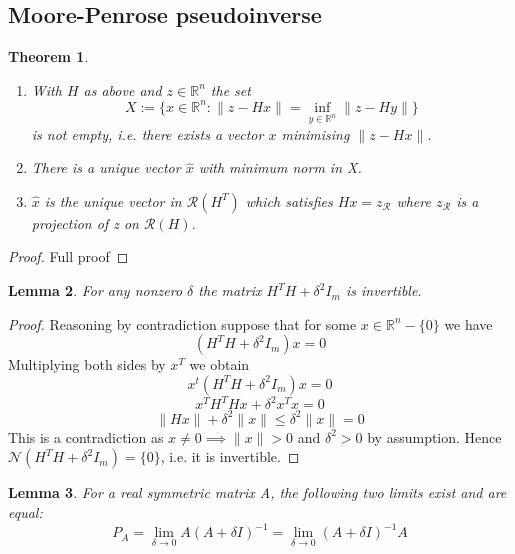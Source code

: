 \documentclass[a4paper]{article}
\theoremstyle{break}
\newtheorem{theorem}{Theorem}[section]
\newtheorem{lemma}[theorem]{Lemma}
\newcommand{\R}{\mathbb{R}}
\newcommand{\Nu}{\mathcal{N}}
\newcommand{\Ra}{\mathcal{R}}
\begin{document}
\subsection{Moore-Penrose pseudoinverse}

\begin{theorem}
\begin{enumerate}
    \item With $H$ as above and $z \in \R^n$ the set
        \begin{equation*}
        X := \{ x \in \R^n : \| z - H x \| = \inf\limits_{y \in \R^n} \| z - H y \| \}
        \end{equation*}
        is not empty, i.e. there exists a vector $x$ minimising $\| z - H x \|$.
    \item There is a unique vector $\hat{x}$ with minimum norm in X.
    \item $\hat{x}$ is the unique vector in $\Ra(H^T)$ which satisfies $Hx = z_\Ra$ where $z_\Ra$ is a projection of z on $\Ra(H)$.
\end{enumerate}
\end{theorem}
\begin{proof}
    Full proof
\end{proof}

\begin{lemma}
    For any nonzero $\delta$ the matrix $H^T H + \delta^2  I_m$ is invertible.
    \label{thm:invertible}
\end{lemma}
\begin{proof}
    Reasoning by contradiction suppose that for some $x \in \R^n - \{0\}$ we have
    $$ (H^T H + \delta^2  I_m) x = 0 $$ %
Multiplying both sides by $x^T$ we obtain
    $$ x^t (H^T H + \delta^2  I_m) x = 0 $$ %
    $$ x^T H^T H x + \delta^2 x^T x = 0 $$
    $$ \| Hx \| + \delta^2 \| x \| \leq \delta^2 \| x \| = 0 $$
This is a contradiction as $ x \neq 0 \implies \| x \| > 0 $ and $ \delta^2 > 0$ by assumption.
Hence $\Nu(H^T H + \delta^2  I_m) = \{0\} $, i.e. it is invertible.
\end{proof}

\begin{lemma}
    For a real symmetric matrix A, the following two limits exist and are equal:
    \begin{equation}
        P_A = \lim_{\delta \to 0} A ( A + \delta I) ^{-1}
            = \lim_{\delta \to 0} ( A + \delta I) ^{-1} A
    \end{equation}
\end{lemma}
\end{document}
